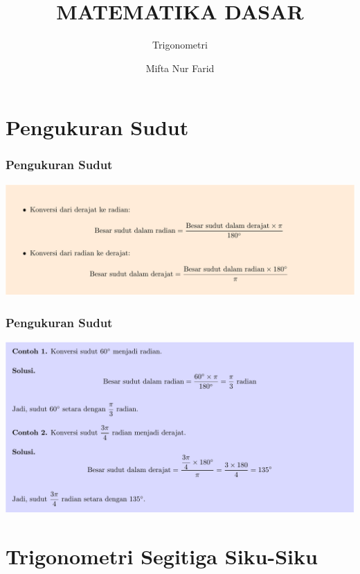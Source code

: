 \documentclass[pdflatex,compress,mathserif]{beamer}
\title{MATEMATIKA DASAR}
\subtitle{Trigonometri}
\author{Mifta Nur Farid}
\begin{document}
\maketitle

\section{Pengukuran Sudut}

\begin{frame}
	\frametitle{Pengukuran Sudut}
	\begin{center}
		\includegraphics[width=\linewidth]{img/img01}
	\end{center}
\end{frame}

\begin{frame}
	\frametitle{Pengukuran Sudut}
	\begin{center}
		\includegraphics[width=\linewidth]{img/img02}
	\end{center}
\end{frame}

\section{Trigonometri Segitiga Siku-Siku}
\end{document}
